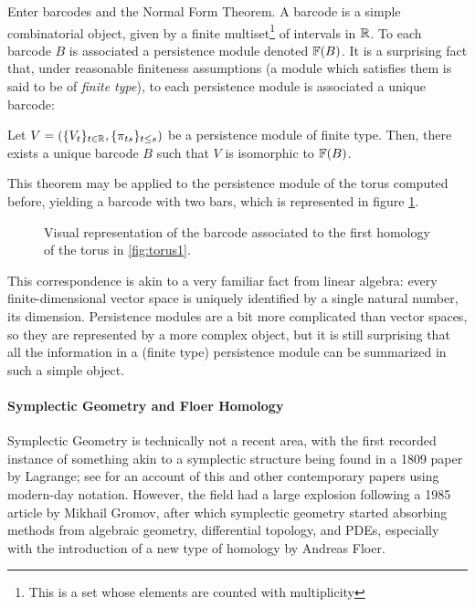 Enter barcodes and the Normal Form Theorem. A barcode is a simple combinatorial object, given by a finite multiset\footnote{This is a set whose elements are counted with multiplicity} of intervals in $\mathbb{R}$. To each barcode $B$ is associated a persistence module denoted $\mathbb{F}(B)$. It is a surprising fact that, under reasonable finiteness assumptions (a module which satisfies them is said to be of \emph{finite type}), to each persistence module is associated a unique barcode:
\begin{theorem*}
Let $V = (\{V_t\}_{t \in \mathbb{R}}, \{\pi_{ts}\}_{t\leq s})$ be a persistence module of finite type. Then, there exists a unique barcode $B$ such that $V$ is isomorphic to $\mathbb{F}(B)$.
\end{theorem*}

This theorem may be applied to the persistence module of the torus computed before, yielding a barcode with two bars, which is represented in figure \ref{fig:bctorus}.

\begin{figure}
\centering
{}
\caption{Visual representation of the barcode associated to the first homology of the torus in \ref{fig:torus1}.}\label{fig:bctorus}
\end{figure}

This correspondence is akin to a very familiar fact from linear algebra: every finite-dimensional vector space is uniquely identified by a single natural number, its dimension. Persistence modules are a bit more complicated than vector spaces, so they are represented by a more complex object, but it is still surprising that all the information in a (finite type) persistence module can be summarized in such a simple object.

\paragraph{Symplectic Geometry and Floer Homology}

Symplectic Geometry is technically not a recent area, with the first recorded instance of something akin to a symplectic structure being found in a 1809 paper by Lagrange; see \cite{marle2009inception} for an account of this and other contemporary papers using modern-day notation. However, the field had a large explosion following a 1985 article by Mikhail Gromov, after which symplectic geometry started absorbing methods from algebraic geometry, differential topology, and PDEs, especially with the introduction of a new type of homology by Andreas Floer.

